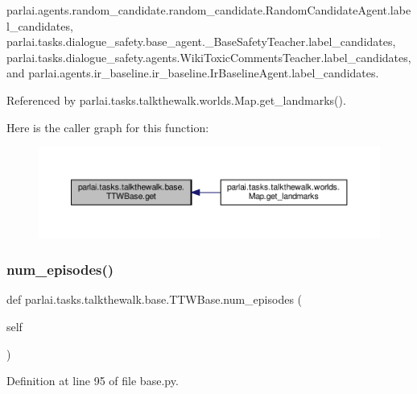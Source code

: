 parlai.\+agents.\+random\+\_\+candidate.\+random\+\_\+candidate.\+Random\+Candidate\+Agent.\+label\+\_\+candidates, parlai.\+tasks.\+dialogue\+\_\+safety.\+base\+\_\+agent.\+\_\+\+Base\+Safety\+Teacher.\+label\+\_\+candidates, parlai.\+tasks.\+dialogue\+\_\+safety.\+agents.\+Wiki\+Toxic\+Comments\+Teacher.\+label\+\_\+candidates, and parlai.\+agents.\+ir\+\_\+baseline.\+ir\+\_\+baseline.\+Ir\+Baseline\+Agent.\+label\+\_\+candidates.



Referenced by parlai.\+tasks.\+talkthewalk.\+worlds.\+Map.\+get\+\_\+landmarks().

Here is the caller graph for this function\+:
\nopagebreak
\begin{figure}[H]
\begin{center}
\leavevmode
\includegraphics[width=350pt]{classparlai_1_1tasks_1_1talkthewalk_1_1base_1_1TTWBase_adda57628371cdbb1afef6f297dab7c54_icgraph}
\end{center}
\end{figure}
\mbox{\label{classparlai_1_1tasks_1_1talkthewalk_1_1base_1_1TTWBase_ab4890c4569ff31724718ed8c684e1a76}} 
\subsubsection{\texorpdfstring{num\+\_\+episodes()}{num\_episodes()}}
{\footnotesize\ttfamily def parlai.\+tasks.\+talkthewalk.\+base.\+T\+T\+W\+Base.\+num\+\_\+episodes (\begin{DoxyParamCaption}\item[{}]{self }\end{DoxyParamCaption})}



Definition at line 95 of file base.\+py.



